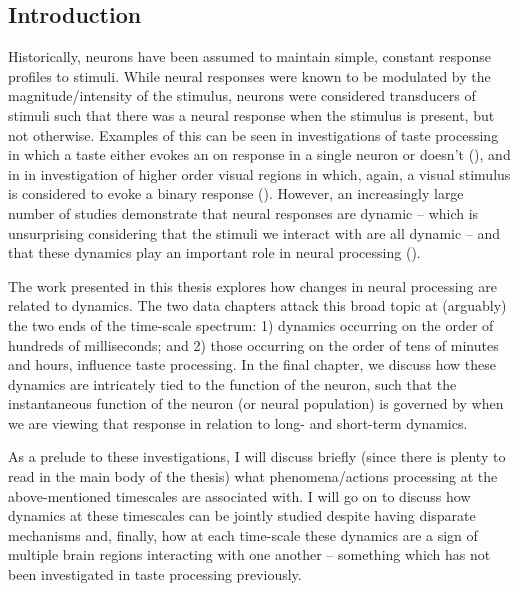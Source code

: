 \begin{refsection}

\chapter{Introduction}

Historically, neurons have been assumed to maintain simple, constant response profiles to stimuli. While neural responses were known to be modulated by the magnitude/intensity of the stimulus, neurons were considered transducers of stimuli such that there was a neural response when the stimulus is present, but not otherwise. Examples of this can be seen in investigations of taste processing in which a taste either evokes an on response in a single neuron or doesn’t (\cite{mark1988a,yaxley1988a,yamamoto1989a}), and in in investigation of higher order visual regions in which, again, a visual stimulus is considered to evoke a binary response (\cite{hasselmo1989a,gross1992a,rolls1995a}). However, an increasingly large number of studies demonstrate that neural responses are dynamic – which is unsurprising considering that the stimuli we interact with are all dynamic – and that these dynamics play an important role in neural processing (\cite{sugase1999a,katz2001a,brincat2006a,sadacca2016a,brincat2018a,saravani2019a}).

The work presented in this thesis explores how changes in neural processing are related to dynamics. The two data chapters attack this broad topic at (arguably) the two ends of the time-scale spectrum: 1) dynamics occurring on the order of hundreds of milliseconds; and 2) those occurring on the order of tens of minutes and hours, influence taste processing. In the final chapter, we discuss how these dynamics are intricately tied to the function of the neuron, such that the instantaneous function of the neuron (or neural population) is governed by when we are viewing that response in relation to long- and short-term dynamics.

As a prelude to these investigations, I will discuss briefly (since there is plenty to read in the main body of the thesis) what phenomena/actions processing at the above-mentioned timescales are associated with. I will go on to discuss how dynamics at these timescales can be jointly studied despite having disparate mechanisms and, finally, how at each time-scale these dynamics are a sign of multiple brain regions interacting with one another – something which has not been investigated in taste processing previously.



\end{refsection}
